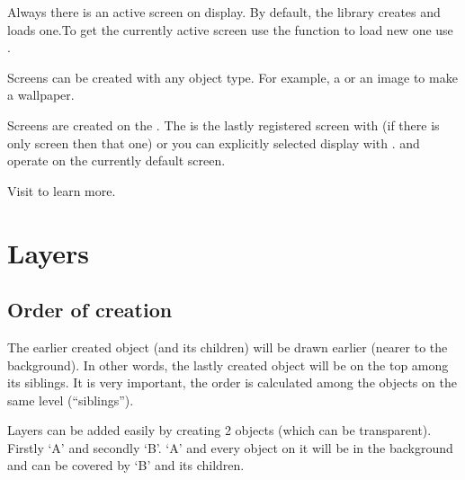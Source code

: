 \documentclass[letterpaper,10pt,english]{sphinxmanual}
\begin{document}
Always there is an active screen on display. By default, the library creates and loads one.To get the currently active screen use the  function to load new one use .

Screens can be created with any object type. For example, a {\hyperref[\detokenize{object-types/obj::doc}]{}} or an image to make a wallpaper.

Screens are created on the .
The  is the lastly registered screen with  (if there is only screen then that one) or you can explicitly selected display with .
 and  operate on the currently default screen.

Visit {\hyperref[\detokenize{overview/display::doc}]{}} to learn more.


\section{Layers}
\label{\detokenize{overview/layers:layers}}\label{\detokenize{overview/layers::doc}}

\subsection{Order of creation}
\label{\detokenize{overview/layers:order-of-creation}}
The earlier created object (and its children) will be drawn earlier (nearer to the background). In other words, the lastly created object will be on the top among its siblings.
It is very important, the order is calculated among the objects on the same level (“siblings”).

Layers can be added easily by creating 2 objects (which can be transparent). Firstly ‘A’ and secondly ‘B’. ‘A’ and every object on it will be in the background and can be covered by ‘B’ and its children.

\end{document}
